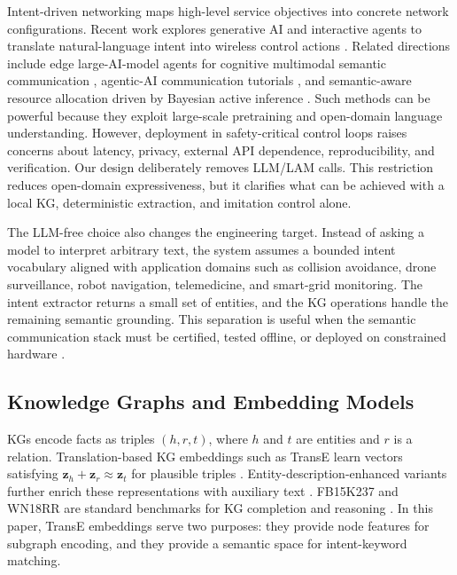 \documentclass[journal]{IEEEtran}
\begin{document}
Intent-driven networking maps high-level service objectives into concrete network configurations. Recent work explores generative AI and interactive agents to translate natural-language intent into wireless control actions \cite{qin2025genai}. Related directions include edge large-AI-model agents for cognitive multimodal semantic communication \cite{sun2026edge}, agentic-AI communication tutorials \cite{jiang2026agentic}, and semantic-aware resource allocation driven by Bayesian active inference \cite{krayani2026aav}. Such methods can be powerful because they exploit large-scale pretraining and open-domain language understanding. However, deployment in safety-critical control loops raises concerns about latency, privacy, external API dependence, reproducibility, and verification. Our design deliberately removes LLM/LAM calls. This restriction reduces open-domain expressiveness, but it clarifies what can be achieved with a local KG, deterministic extraction, and imitation control alone.

The LLM-free choice also changes the engineering target. Instead of asking a model to interpret arbitrary text, the system assumes a bounded intent vocabulary aligned with application domains such as collision avoidance, drone surveillance, robot navigation, telemedicine, and smart-grid monitoring. The intent extractor returns a small set of entities, and the KG operations handle the remaining semantic grounding. This separation is useful when the semantic communication stack must be certified, tested offline, or deployed on constrained hardware \cite{jiang2026agentic,sun2026edge,devoto2026token}.

\subsection{Knowledge Graphs and Embedding Models}

KGs encode facts as triples $(h,r,t)$, where $h$ and $t$ are entities and $r$ is a relation. Translation-based KG embeddings such as TransE learn vectors satisfying $\mathbf{z}_h+\mathbf{z}_r\approx \mathbf{z}_t$ for plausible triples \cite{bordes2013translating}. Entity-description-enhanced variants further enrich these representations with auxiliary text \cite{xie2016transe}. FB15K237 and WN18RR are standard benchmarks for KG completion and reasoning \cite{toutanova2015observed,dettmers2018conve}. In this paper, TransE embeddings serve two purposes: they provide node features for subgraph encoding, and they provide a semantic space for intent-keyword matching.
\end{document}
